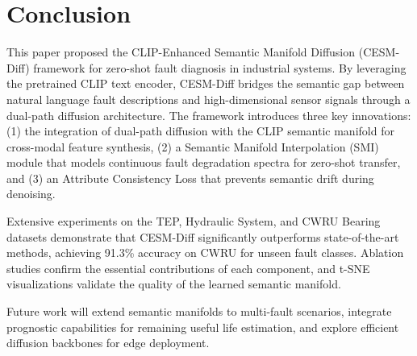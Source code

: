 \section{Conclusion}
\label{sec:conclusion}

This paper proposed the CLIP-Enhanced Semantic Manifold Diffusion (CESM-Diff) framework for zero-shot fault diagnosis in industrial systems. By leveraging the pretrained CLIP text encoder, CESM-Diff bridges the semantic gap between natural language fault descriptions and high-dimensional sensor signals through a dual-path diffusion architecture. The framework introduces three key innovations: (1) the integration of dual-path diffusion with the CLIP semantic manifold for cross-modal feature synthesis, (2) a Semantic Manifold Interpolation (SMI) module that models continuous fault degradation spectra for zero-shot transfer, and (3) an Attribute Consistency Loss that prevents semantic drift during denoising.

Extensive experiments on the TEP, Hydraulic System, and CWRU Bearing datasets demonstrate that CESM-Diff significantly outperforms state-of-the-art methods, achieving 91.3\% accuracy on CWRU for unseen fault classes. Ablation studies confirm the essential contributions of each component, and t-SNE visualizations validate the quality of the learned semantic manifold.

Future work will extend semantic manifolds to multi-fault scenarios, integrate prognostic capabilities for remaining useful life estimation, and explore efficient diffusion backbones for edge deployment.
